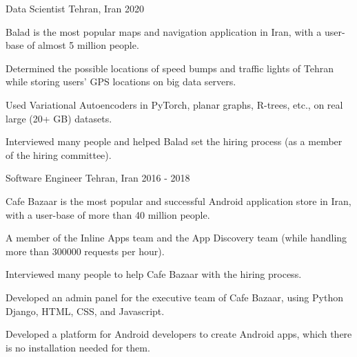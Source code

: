 

\begin{cventries}

 \cventry
    {} %
    {Data Scientist} %
    {Tehran, Iran} %
    {2020} %
    {
      \begin{cvitems} %
        \item {Balad is the most popular maps and navigation application in Iran, with a user-base of almost 5 million people.}
        \item {Determined the possible locations of speed bumps and traffic lights of Tehran while storing users' GPS locations on big data servers.}
        \item {Used Variational Autoencoders in PyTorch, planar graphs, R-trees, etc., on real large (20+ GB) datasets.}
        \item {Interviewed many people and helped Balad set the hiring process (as a member of the hiring committee).}
      \end{cvitems}
    }

  \cventry
    {} %
    {Software Engineer} %
    {Tehran, Iran} %
    {2016 - 2018} %
    {
      \begin{cvitems} %
        \item {Cafe Bazaar is the most popular and successful Android application store in Iran, with a user-base of more than 40 million people.}
        \item {A member of the Inline Apps team and the App Discovery team (while handling more than 300000 requests per hour).}
        \item {Interviewed many people to help Cafe Bazaar with the hiring process.}
        \item {Developed an admin panel for the executive team of Cafe Bazaar, using Python Django, HTML, CSS, and Javascript.}
        \item {Developed a platform for Android developers to create Android apps, which there is no installation needed for them.}
      \end{cvitems}
    }


\end{cventries}
